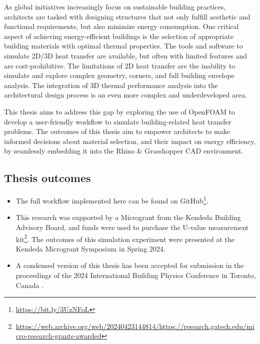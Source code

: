 \thispagestyle{empty}
\begin{summary}
\enlargethispage{2em}

As global initiatives increasingly focus on sustainable building practices, architects are tasked with designing structures that not only fulfill aesthetic and functional requirements, but also minimize energy consumption. One critical aspect of achieving energy-efficient buildings is the selection of appropriate building materials with optimal thermal properties. 
The tools and software to simulate 2D/3D heat transfer are available, but often with limited features and are cost-prohibitive. The limitations of 2D heat transfer are the inability to simulate and explore complex geometry, corners, and full building envelope analysis.
The integration of 3D thermal performance analysis into the architectural design process is an even more complex and underdeveloped area. 


This thesis aims to address this gap by exploring the use of OpenFOAM to develop a user-friendly workflow to simulate building-related heat transfer problems.
The outcomes of this thesis aim to empower architects to make informed decisions about material selection, and their impact on energy efficiency, by seamlessly embedding it into the Rhino \& Grasshopper CAD environment. 

\vspace{-0.5em}

\subsection*{Thesis outcomes}


\begin{itemize}[topsep=0pt,itemsep=0pt,partopsep=0pt, parsep=0pt]

    \item  The full workflow implemented here can be found on GitHub\footnote{\url{https://bit.ly/3UzNFoL}}.

    \item This research was supported by a Microgrant   \cite{kendeda} from the Kendeda Building Advisory Board, and funds were used to purchase the U-value measurement kit\footnote{\url{https://web.archive.org/web/20240423144814/https://research.gatech.edu/micro-research-grants-awarded}}. The outcomes of this simulation experiment were presented at the Kendeda Microgrant Symposium in Spring 2024.
    
    \item A condensed version of this thesis has been accepted for submission in the proceedings of the 2024 International Building Physics Conference in Toronto, Canada \cite{MPIbpc}.
    
    

\end{itemize}

\end{summary} 


